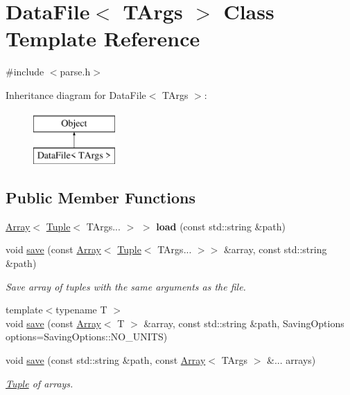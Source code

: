 \hypertarget{classDataFile}{}\section{Data\+File$<$ T\+Args $>$ Class Template Reference}
\label{classDataFile}


{\ttfamily \#include $<$parse.\+h$>$}

Inheritance diagram for Data\+File$<$ T\+Args $>$\+:\begin{figure}[H]
\begin{center}
\leavevmode
\includegraphics[height=2.000000cm]{classDataFile}
\end{center}
\end{figure}
\subsection*{Public Member Functions}
\begin{DoxyCompactItemize}
\item 
\hypertarget{classDataFile_a39baec6df72d09c9fc17ce1448e434ed}{}\label{classDataFile_a39baec6df72d09c9fc17ce1448e434ed} 
\hyperlink{classArray}{Array}$<$ \hyperlink{classTuple}{Tuple}$<$ T\+Args... $>$ $>$ {\bfseries load} (const std\+::string \&path)
\item 
\hypertarget{classDataFile_ae4cfc73ee9970372638ccb9fe8a2ce25}{}\label{classDataFile_ae4cfc73ee9970372638ccb9fe8a2ce25} 
void \hyperlink{classDataFile_ae4cfc73ee9970372638ccb9fe8a2ce25}{save} (const \hyperlink{classArray}{Array}$<$ \hyperlink{classTuple}{Tuple}$<$ T\+Args... $>$$>$ \&array, const std\+::string \&path)
\begin{DoxyCompactList}\small\item\em Save array of tuples with the same arguments as the file. \end{DoxyCompactList}\item 
{\footnotesize template$<$typename T $>$ }\\void \hyperlink{classDataFile_a2ed8b7e88e74a459050959b782008821}{save} (const \hyperlink{classArray}{Array}$<$ T $>$ \&array, const std\+::string \&path, Saving\+Options options=Saving\+Options\+::\+N\+O\+\_\+\+U\+N\+I\+TS)
\item 
\hypertarget{classDataFile_a05882080cb1a937a64d6777600e8bc50}{}\label{classDataFile_a05882080cb1a937a64d6777600e8bc50} 
void \hyperlink{classDataFile_a05882080cb1a937a64d6777600e8bc50}{save} (const std\+::string \&path, const \hyperlink{classArray}{Array}$<$ T\+Args $>$ \&... arrays)
\begin{DoxyCompactList}\small\item\em \hyperlink{classTuple}{Tuple} of arrays. \end{DoxyCompactList}\end{DoxyCompactItemize}


